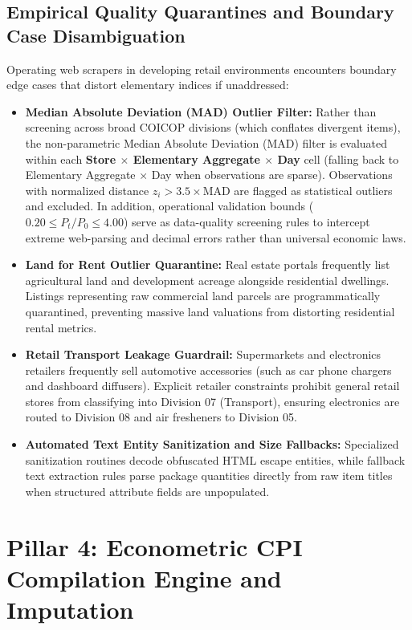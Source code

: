 \subsection{Empirical Quality Quarantines and Boundary Case Disambiguation}
\hs Operating web scrapers in developing retail environments encounters boundary edge cases that distort elementary indices if unaddressed:
\begin{itemize}
    \item \textbf{Median Absolute Deviation (MAD) Outlier Filter:} Rather than screening across broad COICOP divisions (which conflates divergent items), the non-parametric Median Absolute Deviation (MAD) filter is evaluated within each \textbf{Store $\times$ Elementary Aggregate $\times$ Day} cell (falling back to Elementary Aggregate $\times$ Day when observations are sparse). Observations with normalized distance $z_i > 3.5 \times \text{MAD}$ are flagged as statistical outliers and excluded. In addition, operational validation bounds ($0.20 \le P_t/P_0 \le 4.00$) serve as data-quality screening rules to intercept extreme web-parsing and decimal errors rather than universal economic laws.
    \item \textbf{Land for Rent Outlier Quarantine:} Real estate portals frequently list agricultural land and development acreage alongside residential dwellings. Listings representing raw commercial land parcels are programmatically quarantined, preventing massive land valuations from distorting residential rental metrics.
    \item \textbf{Retail Transport Leakage Guardrail:} Supermarkets and electronics retailers frequently sell automotive accessories (such as car phone chargers and dashboard diffusers). Explicit retailer constraints prohibit general retail stores from classifying into Division 07 (Transport), ensuring electronics are routed to Division 08 and air fresheners to Division 05.
    \item \textbf{Automated Text Entity Sanitization and Size Fallbacks:} Specialized sanitization routines decode obfuscated HTML escape entities, while fallback text extraction rules parse package quantities directly from raw item titles when structured attribute fields are unpopulated.
\end{itemize}


\section{Pillar 4: Econometric CPI Compilation Engine and Imputation}

